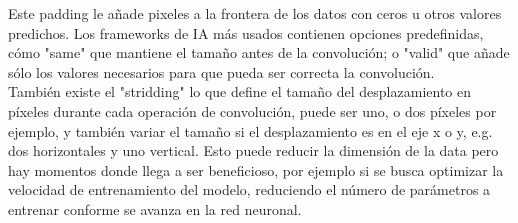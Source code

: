 Este padding le añade pixeles a la frontera de los datos con ceros u otros valores predichos. Los frameworks de IA más usados contienen opciones predefinidas, cómo "same" que mantiene el tamaño antes de la convolución; o "valid" que añade sólo los valores necesarios para que pueda ser correcta la convolución.\\

También existe el "stridding" lo que define el tamaño del desplazamiento en píxeles durante cada operación de convolución, puede ser uno, o dos píxeles por ejemplo, y también variar el tamaño si el desplazamiento es en el eje x o y, e.g. dos horizontales y uno vertical. Esto puede reducir la dimensión de la data pero hay momentos donde llega a ser beneficioso, por ejemplo si se busca optimizar la velocidad de entrenamiento del modelo, reduciendo el número de parámetros a entrenar conforme se avanza en la red neuronal.\\
